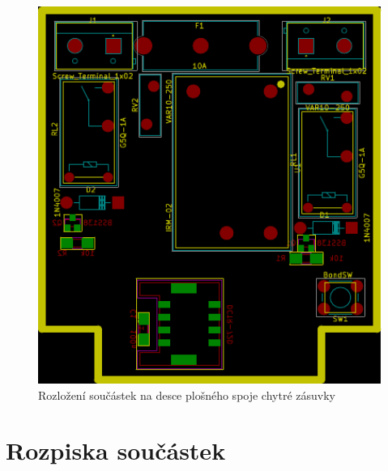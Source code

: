 \documentclass[12pt,a4paper,oneside]{article}
\begin{document}
\begin{figure}[H]
\label{fig:components}
\minipage{\textwidth}
\includegraphics[width = 128mm]{img/components.pdf}
\caption{Rozložení součástek na desce plošného spoje chytré zásuvky}
\endminipage
\end{figure}

\section{Rozpiska součástek}
\end{document}
